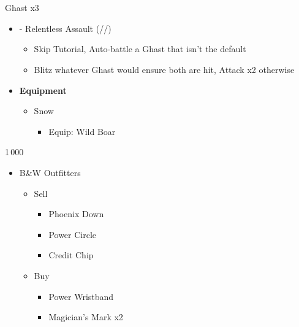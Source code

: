 \chapter[Chapter 3]{}

\renewcommand{\first}{[1] - Relentless Assault (\com/\rav/\rav)}
\begin{multicols}{2}

\begin{battle}{Ghast x3}
\begin{itemize}
    \item \first
    \begin{itemize}
        \item Skip Tutorial, Auto-battle a Ghast that isn't the default
        \item Blitz whatever Ghast would ensure both are hit, Attack x2 otherwise
    \end{itemize}
\end{itemize}
\end{battle}
\begin{menu}
\begin{itemize}
    \item \textbf{Equipment}
    \begin{itemize}
        \item Snow
        \begin{itemize}
            \item Equip: Wild Boar
        \end{itemize}
    \end{itemize}
\end{itemize}
\end{menu}
\begin{shop}{1\,000}
\begin{itemize}
    \item B\&W Outfitters
    \begin{itemize}
        \item Sell
        \begin{itemize}
            \item Phoenix Down
            \item Power Circle
            \item Credit Chip
        \end{itemize}
        \item Buy
        \begin{itemize}
            \item Power Wristband
            \item Magician's Mark x2

\end{itemize}
\end{itemize}
\end{itemize}
\end{shop}
\end{multicols}
